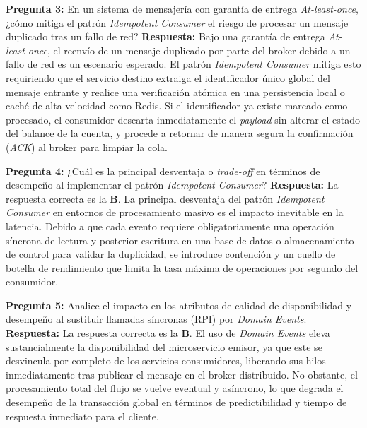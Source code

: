 \noindent\textbf{Pregunta 3:} En un sistema de mensajería con garantía de entrega \textit{At-least-once}, ¿cómo mitiga el patrón \textit{Idempotent Consumer} el riesgo de procesar un mensaje duplicado tras un fallo de red?
\newline
\textbf{Respuesta:} Bajo una garantía de entrega \textit{At-least-once}, el reenvío de un mensaje duplicado por parte del broker debido a un fallo de red es un escenario esperado. El patrón \textit{Idempotent Consumer} mitiga esto requiriendo que el servicio destino extraiga el identificador único global del mensaje entrante y realice una verificación atómica en una persistencia local o caché de alta velocidad como Redis. Si el identificador ya existe marcado como procesado, el consumidor descarta inmediatamente el \textit{payload} sin alterar el estado del balance de la cuenta, y procede a retornar de manera segura la confirmación (\textit{ACK}) al broker para limpiar la cola.

\vspace{4mm}

\noindent\textbf{Pregunta 4:} ¿Cuál es la principal desventaja o \textit{trade-off} en términos de desempeño al implementar el patrón \textit{Idempotent Consumer}?
\newline
\textbf{Respuesta:} La respuesta correcta es la \textbf{B}. La principal desventaja del patrón \textit{Idempotent Consumer} en entornos de procesamiento masivo es el impacto inevitable en la latencia. Debido a que cada evento requiere obligatoriamente una operación síncrona de lectura y posterior escritura en una base de datos o almacenamiento de control para validar la duplicidad, se introduce contención y un cuello de botella de rendimiento que limita la tasa máxima de operaciones por segundo del consumidor.

\vspace{4mm}

\noindent\textbf{Pregunta 5:} Analice el impacto en los atributos de calidad de disponibilidad y desempeño al sustituir llamadas síncronas (RPI) por \textit{Domain Events}.
\newline
\textbf{Respuesta:} La respuesta correcta es la \textbf{B}. El uso de \textit{Domain Events} eleva sustancialmente la disponibilidad del microservicio emisor, ya que este se desvincula por completo de los servicios consumidores, liberando sus hilos inmediatamente tras publicar el mensaje en el broker distribuido. No obstante, el procesamiento total del flujo se vuelve eventual y asíncrono, lo que degrada el desempeño de la transacción global en términos de predictibilidad y tiempo de respuesta inmediato para el cliente.

